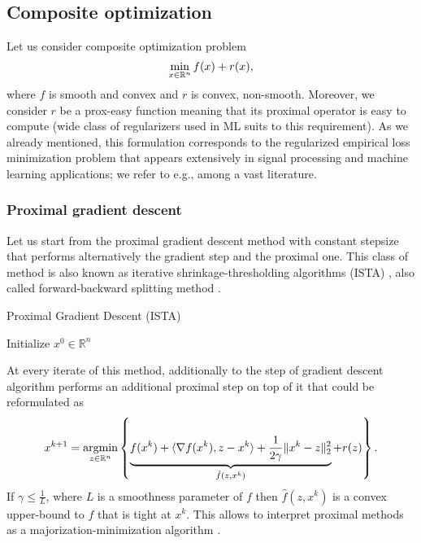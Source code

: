 \subsection{Composite optimization}\label{sec:basics_composite}
Let us consider composite optimization problem
\begin{equation}\label{eq:pb_composite}
\min_{x\in\mathbb{R}^n} f(x) + r(x),
\end{equation}
where $f$ is smooth and convex and $r$ is convex, non-smooth. Moreover, we consider $r$ be a prox-easy function meaning that its proximal operator is easy to compute (wide class of regularizers used in ML suits to this requirement). As we already mentioned, this formulation corresponds to the regularized empirical loss minimization problem that appears extensively in signal processing and machine learning applications; we refer to e.g.\;\cite{candes2008enhancing,combettes2011proximal,bach2012optimization}, among a vast literature.



\subsubsection{Proximal gradient descent}
Let us start from the proximal gradient descent method with constant stepsize that performs alternatively the gradient step and the proximal one. This class of method is also known as iterative shrinkage-thresholding algorithms (ISTA) \cite{daubechies2004iterative}, also called forward-backward splitting method \cite{gabay1983chapter, combettes2011proximal, raguet2013generalized}.

\begin{algorithm}
    \caption{Proximal Gradient Descent (ISTA)}
    \label{algo:pgd}
    \begin{algorithmic}
        \STATE Initialize $x^0\in\mathbb{R}^n$
        \ENDFOR
    \end{algorithmic}
\end{algorithm}

At every iterate of this method, additionally to the step of gradient descent algorithm performs an additional proximal step on top of it that could be reformulated as
\begin{equation}\label{eq:step_pgd}
x^{k+1} = \operatorname*{argmin}_{z\in\mathbb{R}^n}\left\{\underbrace{f(x^k) + \langle\nabla f(x^k), z-x^k\rangle+\frac{1}{2\gamma}\|x^k-z\|_2^2}_{\hat{f}(z, x^k)} + r(z)\right\}.
\end{equation}
If $\gamma\leq \frac{1}{L}$, where $L$ is a smoothness parameter of $f$ then $\hat{f}(z, x^k)$ is a convex upper-bound to $f$ that is tight at $x^k$. This allows to interpret proximal methods as a majorization-minimization algorithm \cite{mairal2015incremental}.

